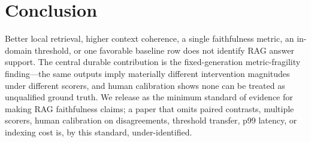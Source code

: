 \section{Conclusion}
\label{sec:conclusion}

Better local retrieval, higher context coherence, a single faithfulness
metric, an in-domain threshold, or one favorable baseline row does not
identify RAG answer support. The central durable contribution is the
fixed-generation metric-fragility finding---the same outputs imply materially
different intervention magnitudes under different scorers, and human
calibration shows none can be treated as unqualified ground truth. We release
\method{} as the minimum standard of evidence for making RAG faithfulness
claims; a paper that omits paired contrasts, multiple scorers, human
calibration on disagreements, threshold transfer, p99 latency, or indexing
cost is, by this standard, under-identified.
